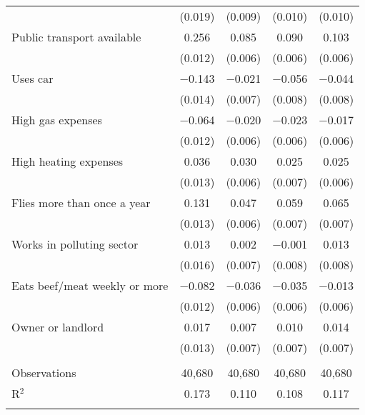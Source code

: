\begin{tabular}{@{\extracolsep{5pt}}lcccc}
  & (0.019) & (0.009) & (0.010) & (0.010) \\ 
  Public transport available & 0.256 & 0.085 & 0.090 & 0.103 \\ 
  & (0.012) & (0.006) & (0.006) & (0.006) \\ 
  Uses car & $-$0.143 & $-$0.021 & $-$0.056 & $-$0.044 \\ 
  & (0.014) & (0.007) & (0.008) & (0.008) \\ 
  High gas expenses & $-$0.064 & $-$0.020 & $-$0.023 & $-$0.017 \\ 
  & (0.012) & (0.006) & (0.006) & (0.006) \\ 
  High heating expenses & 0.036 & 0.030 & 0.025 & 0.025 \\ 
  & (0.013) & (0.006) & (0.007) & (0.006) \\ 
  Flies more than once a year & 0.131 & 0.047 & 0.059 & 0.065 \\ 
  & (0.013) & (0.006) & (0.007) & (0.007) \\ 
  Works in polluting sector & 0.013 & 0.002 & $-$0.001 & 0.013 \\ 
  & (0.016) & (0.007) & (0.008) & (0.008) \\ 
  Eats beef/meat weekly or more & $-$0.082 & $-$0.036 & $-$0.035 & $-$0.013 \\ 
  & (0.012) & (0.006) & (0.006) & (0.006) \\ 
  Owner or landlord & 0.017 & 0.007 & 0.010 & 0.014 \\ 
  & (0.013) & (0.007) & (0.007) & (0.007) \\ 
 \hline \\[-1.8ex] 

Observations & 40,680 & 40,680 & 40,680 & 40,680 \\ 
R$^{2}$ & 0.173 & 0.110 & 0.108 & 0.117 \\ 
\hline 
\hline \\[-1.8ex] 
\end{tabular} 
